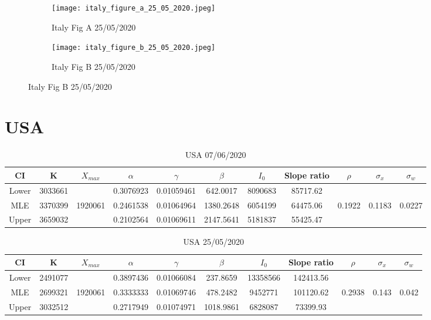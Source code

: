 \documentclass{article}
\begin{document}
\begin{figure}[htb]
\centering
    \begin{subfigure}{0.5\textwidth}
        \texttt{[image: italy\_figure\_a\_25\_05\_2020.jpeg]}
        \caption{Italy Fig A 25/05/2020}
        \label{fig:italy_figure_a_25_05_2020}
    \end{subfigure}%
        \begin{subfigure}{0.5\textwidth}                                   \texttt{[image: italy\_figure\_b\_25\_05\_2020.jpeg]}
        \caption{Italy Fig B 25/05/2020}
        \label{fig:italy_figure_b_25_05_2020}
    \end{subfigure}
\end{figure}

\section{USA}

\begin{table}[ht]
    \centering
\begin{tabular}{|c|c|c|c|c|c|c|c|c|c|c|}
     \hline
     CI & K & $X_{max}$ & $\alpha$ & $\gamma$ & $\beta$ & $I_0$ & Slope ratio  & $\rho$ & $\sigma_x$ & $\sigma_w$\\
     \hline
     \hline
Lower	&3033661&	&0.3076923	&0.01059461	&642.0017	&8090683 &	85717.62   & & &\\
\hline
MLE	    &3370399& 1920061	&0.2461538	&0.01064964	&1380.2648&	6054199	& 64475.06  & 0.1922  & 0.1183 & 0.0227 \\
\hline
Upper	&3659032&	&0.2102564	&0.01069611	&2147.5641&	5181837	& 55425.47     & & &\\
\hline
\end{tabular}
    \caption{USA 07/06/2020}
\end{table}

\begin{table}[ht]
    \centering
\begin{tabular}{|c|c|c|c|c|c|c|c|c|c|c|}
     \hline
     CI & K & $X_{max}$ & $\alpha$ & $\gamma$ & $\beta$ & $I_0$ & Slope ratio  & $\rho$ & $\sigma_x$ & $\sigma_w$\\
     \hline
     \hline
Lower&2491077&	&0.3897436	&0.01066084&	237.8659	&13358566&	142413.56    & & &  \\
\hline
MLE	 & 2699321 & 1920061	&0.3333333	&0.01069746&	478.2482	&9452771	& 101120.62 & 0.2938  & 0.143 & 0.042 \\
\hline
Upper&3032512&	&0.2717949	&0.01074971&	1018.9861&	6828087&	73399.93     & & &  \\
\hline
\end{tabular}
    \caption{USA 25/05/2020}
\end{table}
\end{document}
